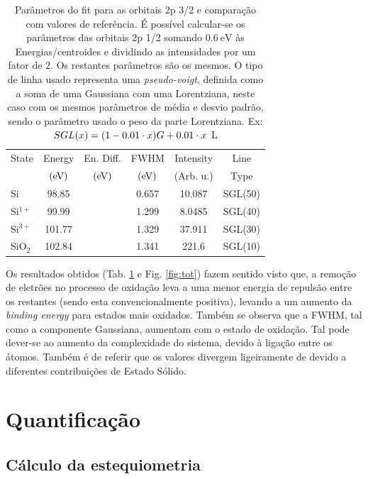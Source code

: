 \documentclass[baaa]{baaa}
\begin{document}
\begin{table}[h!]
  \centering
  \caption{Parâmetros do fit para as orbitais 2p 3/2 e comparação com valores de referência\cite{Nist}. É possível calcular-se os parâmetros das orbitais 2p 1/2 somando $0.6\ \si{\electronvolt}$ às Energias/centroides e dividindo as intensidades por um fator de 2. Os restantes parâmetros são os mesmos. O tipo de linha usado representa uma \textit{pseudo-voigt}, definida como a soma de uma Gaussiana com uma Lorentziana, neste caso com os mesmos parâmetros de média e desvio padrão, sendo o parâmetro usado o peso da parte Lorentziana. Ex:$SGL\qty(x)=\qty(1-0.01\cdot x) G + 0.01\cdot x$ L}
  \begin{tabular}{lccccc}
    \hline\hline\noalign{\smallskip}
    State & Energy &En. Diff.& FWHM& Intensity&Line\\
    & $\qty(\si{\electronvolt})$&$\qty(\si{\electronvolt})$& $\qty(\si{\electronvolt})$& (Arb. u.)&Type\\
    \hline\noalign{\smallskip}
    Si &98.85&& 0.657 &10.087&SGL(50)\\
    Si$^{1+}$&99.99&& 1.299 & 8.0485&SGL(40)\\
    Si$^{3+}$&101.77&&1.329&37.911&SGL(30)\\
    SiO$_2$ & 102.84&&1.341&221.6&SGL(10)\\
    \hline
    \end{tabular}
    \label{table:params}
\end{table}


Os resultados obtidos (Tab. \ref{table:params} e Fig. \ref{fig:tot}) fazem sentido visto que, a remoção de eletrões no processo de oxidação leva a uma menor energia de repulsão entre os restantes (sendo esta convencionalmente positiva), levando a um aumento da \textit{binding energy} para estados mais oxidados. Também se observa que a FWHM, tal como a componente Gaussiana, aumentam com o estado de oxidação. Tal pode dever-se ao aumento da complexidade do sistema, devido à ligação entre os átomos. Também é de referir que os valores divergem ligeiramente de \cite{Himpsel} devido a diferentes contribuições de Estado Sólido.



\section{Quantificação}

\subsection{Cálculo da estequiometria}
\end{document}

